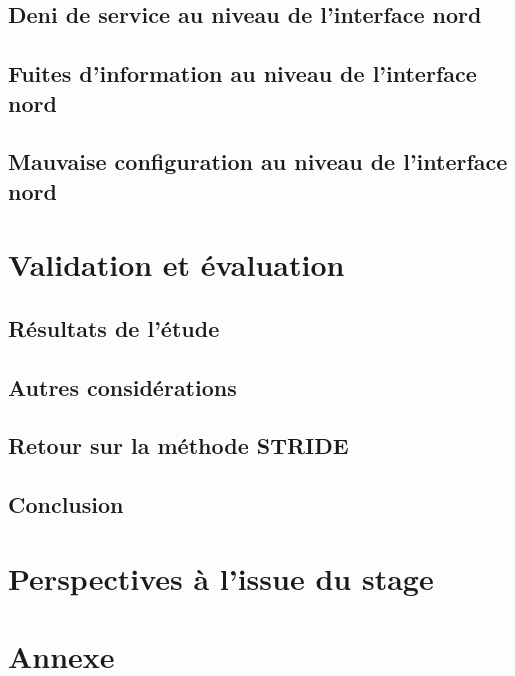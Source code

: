 \documentclass[11pt]{article}
\begin{document}
	\subsection{Deni de service au niveau de l'interface nord}
		
		\newpage
	\subsection{Fuites d'information au niveau de l'interface nord}
		
		\newpage
	\subsection{Mauvaise configuration au niveau de l'interface nord}
		
\newpage
{}
\section{Validation et évaluation}
	\subsection{Résultats de l'étude}
		
	\subsection{Autres considérations}
		
	\subsection{Retour sur la méthode STRIDE}
		
	\newpage
	\subsection{Conclusion}
		
\newpage
{}
\section{Perspectives à l'issue du stage}
	

\newpage
{}
\begin{small}


\end{small}
\nocite{*}

\newpage
\fancyhead[L]{~\\}
\appendix
\section{Annexe}
	
	\newpage
	
	\newpage
	
	\newpage
	
	\newpage
	
\end{document}
